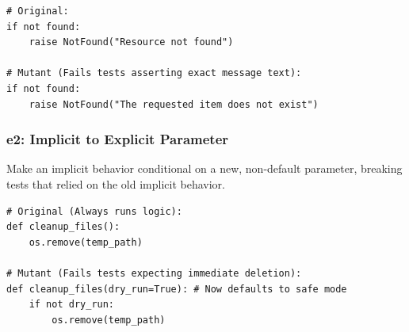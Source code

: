 \documentclass[11pt]{article}
\begin{document}
\begin{listing}[H]
\begin{verbatim}
# Original:
if not found:
    raise NotFound("Resource not found")

# Mutant (Fails tests asserting exact message text):
if not found:
    raise NotFound("The requested item does not exist")
\end{verbatim}
\caption{e1: Semantic equivalent but textually different errors}
\label{code:e1}
\end{listing}

\subsubsection*{e2: Implicit to Explicit Parameter}
Make an implicit behavior conditional on a new, non-default parameter, breaking tests that relied on the old implicit behavior.

\begin{listing}[H]
\begin{verbatim}
# Original (Always runs logic):
def cleanup_files():
    os.remove(temp_path)

# Mutant (Fails tests expecting immediate deletion):
def cleanup_files(dry_run=True): # Now defaults to safe mode
    if not dry_run:
        os.remove(temp_path)
\end{verbatim}
\caption{e2: Changing behavior via new explicit parameters}
\label{code:e2}
\end{listing}
\end{document}
